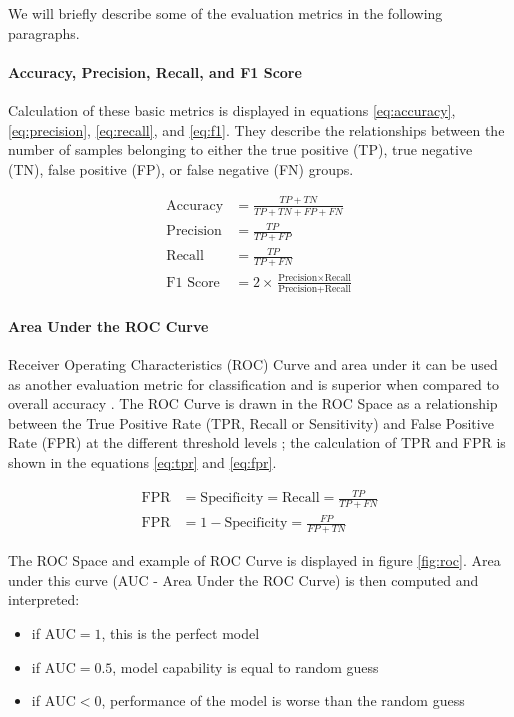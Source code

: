 We will briefly describe some of the evaluation metrics in the following paragraphs. 

\paragraph{Accuracy, Precision, Recall, and F1 Score} Calculation of these basic metrics is displayed in equations \ref{eq:accuracy}, \ref{eq:precision}, \ref{eq:recall}, and \ref{eq:f1}. They describe the relationships between the number of samples belonging to either the true positive (TP), true negative (TN), false positive (FP), or false negative (FN) groups.

\begin{align}
\label{eq:accuracy}
\text{Accuracy} &= \frac{TP + TN}{TP + TN + FP + FN} \\
\label{eq:precision}
\text{Precision} &= \frac{TP}{TP + FP} \\
\label{eq:recall}
\text{Recall} &= \frac{TP}{TP + FN} \\
\label{eq:f1}
\text{F1\ Score} &= 2 \!\times\! \frac{\text{Precision} \!\times\! \text{Recall}}{\text{Precision} + \text{Recall}}
\end{align}

\paragraph{Area Under the ROC Curve}
Receiver Operating Characteristics (ROC) Curve and area under it can be used as another evaluation metric for classification and is superior when compared to overall accuracy \cite{Bradley1997}. The ROC Curve is drawn in the ROC Space as a relationship between the True Positive Rate (TPR, Recall or Sensitivity) and False Positive Rate (FPR) at the different threshold levels \cite{Bradley1997, Nahm2022, Fawcett2006}; the calculation of TPR and FPR is shown in the equations \ref{eq:tpr} and \ref{eq:fpr}.

\begin{align}
\label{eq:tpr}
\text{FPR} &=\text{Specificity} = \text{Recall} = \frac{TP}{TP + FN} \\
\label{eq:fpr}
\text{FPR} &= 1-\text{Specificity} = \frac{FP}{FP + TN}
\end{align}

The ROC Space and example of ROC Curve is displayed in figure \ref{fig:roc}. Area under this curve (AUC - Area Under the ROC Curve) is then computed and interpreted:

\begin{itemize}
    \item if $\text{AUC} = 1$, this is the perfect model
    \item if $\text{AUC} = 0.5$, model capability is equal to random guess
    \item if $\text{AUC} < 0$, performance of the model is worse than the random guess
\end{itemize}

